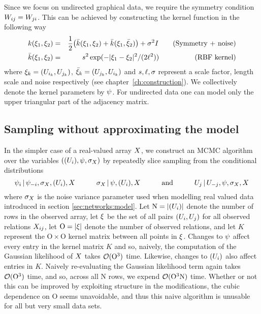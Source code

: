 Since we focus on undirected graphical data, we require the symmetry condition $W_{ij} = W_{ji}$. This can be achieved by constructing the kernel function in the following way \citep[e.g.][]{Duvenaud2014-em}
\begin{eqnarray}
k(\xi_1, \xi_2) & = & \frac{1}{2}\big(\bar{k}(\xi_1, \xi_2) + \bar{k}(\xi_1, \bar{\xi}_2)\big) + \sigma^2I \quad \quad \textrm{(Symmetry + noise)} \\
\bar{k}(\xi_1, \xi_2) & = & s^2\exp(-|\xi_1 - \xi_2|^2/(2\ell^2)) \quad \quad \quad \quad \quad \textrm{(RBF kernel)}
\end{eqnarray}
where $\xi_k = (U_{i_k}, U_{j_k})$, $\bar{\xi}_k= (U_{j_k}, U_{i_k})$ and $s, \ell, \sigma$ represent a scale factor, length scale and noise respectively (see \eg chapter~\ref{ch:construction}). We collectively denote the kernel parameters by $\psi$.
For undirected data one can model only the upper triangular part of the adjacency matrix.

\subsection{Sampling without approximating the model}

\newcommand{\numobs}{\mathrm O}
\newcommand{\numnodes}{\mathrm N}
In the simpler case of a real-valued array $X$, we construct an MCMC algorithm over the variables $((U_i),\psi, \sigma_X)$ by repeatedly slice sampling \citep{Neal2003-zv} from the conditional distributions
\[
\psi_i \,|\, \psi_{-i}, \sigma_X, (U_i), X
\qquad\quad
\sigma_X \,|\, \psi, (U_i), X
\qquad\quad \text{and} \qquad\quad
U_j \,|\, U_{-j}, \psi, \sigma_X, X
\]
where $\sigma_X$ is the noise variance parameter used when modelling real valued data introduced in section \ref{sec:networks:model}.
Let $\numnodes = |(\AHvar_{i})|$ denote the number of rows in the observed array,
let $\xi$ be the set of all pairs $(U_i,U_j)$ for all observed relations $X_{ij}$, 
let $\numobs = |\inputpoints|$ denote the number of observed relations,
and 
let $K$ represent the $\numobs \times \numobs$ kernel matrix between all points in $\xi$. Changes to $\psi$ affect every entry in the kernel matrix $K$ and so, naively, the computation of the Gaussian likelihood of $X$ takes $\CompOrder(\numobs^3)$ time.  Likewise, changes to $(U_i)$ also affect entries in $K$. Naively re-evaluating the Gaussian likelihood term again takes $\CompOrder(\numobs^3)$ time, and so, across all $\numnodes$ rows, we expend $\CompOrder(\numobs^3 \numnodes)$ time. Whether or not this can be improved by exploiting structure in the modifications, the cubic dependence on $\numobs$ seems unavoidable, and thus this naive algorithm is unusable for all but very small data sets. 


